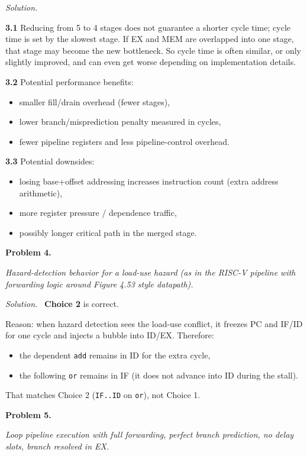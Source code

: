 \documentclass[12pt]{article}
\newcommand{\problem}[1]{\vspace{0.8em}\noindent\textbf{Problem #1.}\vspace{0.35em}}
\newenvironment{solution}{\par\noindent\textit{Solution.}\ }{\par\vspace{1.1em}}
\newcommand{\subproblem}[1]{\par\vspace{0.45em}\noindent\textbf{#1}\quad}
\newcommand{\assigntext}[1]{\par\vspace{0.25em}\small\textit{#1}\par\vspace{0.35em}}
\begin{document}
\begin{solution}
\subproblem{3.1}
Reducing from 5 to 4 stages does not guarantee a shorter cycle time; cycle time is set by the slowest stage. If EX and MEM are overlapped into one stage, that stage may become the new bottleneck. So cycle time is often similar, or only slightly improved, and can even get worse depending on implementation details.

\subproblem{3.2}
Potential performance benefits:
\begin{itemize}
\item smaller fill/drain overhead (fewer stages),
\item lower branch/misprediction penalty measured in cycles,
\item fewer pipeline registers and less pipeline-control overhead.
\end{itemize}

\subproblem{3.3}
Potential downsides:
\begin{itemize}
\item losing base+offset addressing increases instruction count (extra address arithmetic),
\item more register pressure / dependence traffic,
\item possibly longer critical path in the merged stage.
\end{itemize}
\end{solution}

\problem{4}
\assigntext{Hazard-detection behavior for a load-use hazard (as in the RISC-V pipeline with forwarding logic around Figure 4.53 style datapath).}

\begin{solution}
\textbf{Choice 2} is correct.

Reason: when hazard detection sees the load-use conflict, it freezes PC and IF/ID for one cycle and injects a bubble into ID/EX. Therefore:
\begin{itemize}
\item the dependent \texttt{add} remains in ID for the extra cycle,
\item the following \texttt{or} remains in IF (it does not advance into ID during the stall).
\end{itemize}
That matches Choice 2 (\texttt{IF..ID} on \texttt{or}), not Choice 1.
\end{solution}

\problem{5}
\assigntext{Loop pipeline execution with full forwarding, perfect branch prediction, no delay slots, branch resolved in EX.}
\end{document}
